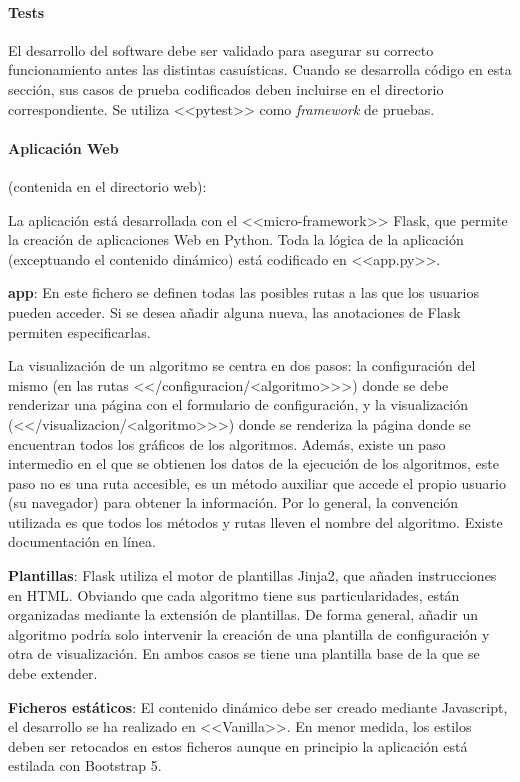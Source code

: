 \paragraph{Tests} El desarrollo del software debe ser validado para asegurar su
correcto funcionamiento antes las distintas casuísticas. Cuando se desarrolla
código en esta sección, sus casos de prueba codificados deben incluirse en el
directorio correspondiente. Se utiliza <<pytest>> como \textit{framework} de
pruebas.


\paragraph{Aplicación Web} (contenida en el directorio web):  

La aplicación está desarrollada con el <<micro-framework>> Flask, que permite la
creación de aplicaciones Web en Python. Toda la lógica de la aplicación
(exceptuando el contenido dinámico) está codificado en <<app.py>>. 

\textbf{app}: En este fichero se definen todas las posibles rutas a las que los
usuarios pueden acceder. Si se desea añadir alguna nueva, las anotaciones de Flask
permiten especificarlas.

La visualización de un algoritmo se centra en dos pasos: la configuración del
mismo (en las rutas <</configuracion/<algoritmo>\>>>) donde se debe renderizar
una página con el formulario de configuración, y la visualización
(<</visualizacion/<algoritmo>\>>>) donde se renderiza la página donde se
encuentran todos los gráficos de los algoritmos. Además, existe un paso
intermedio en el que se obtienen los datos de la ejecución de los algoritmos,
este paso no es una ruta accesible, es un método auxiliar que accede el propio
usuario (su navegador) para obtener la información. Por lo general, la
convención utilizada es que todos los métodos y rutas lleven el nombre del
algoritmo. Existe documentación en línea.

\textbf{Plantillas}: Flask utiliza el motor de plantillas Jinja2, que añaden
instrucciones en HTML. Obviando que cada algoritmo tiene sus particularidades,
están organizadas mediante la extensión de plantillas. De forma general, añadir
un algoritmo podría solo intervenir la creación de una plantilla de
configuración y otra de visualización. En ambos casos se tiene una plantilla
base de la que se debe extender.

\textbf{Ficheros estáticos}: El contenido dinámico debe ser creado mediante
Javascript, el desarrollo se ha realizado en <<Vanilla>>. En menor medida, los
estilos deben ser retocados en estos ficheros aunque en principio la aplicación
está estilada con Bootstrap 5.

